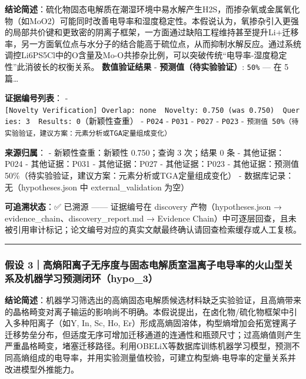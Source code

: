\documentclass[12pt,a4paper]{ctexart}
\begin{document}
\textbf{结论简述}：硫化物固态电解质在潮湿环境中易水解产生H2S，而掺杂氧或金属氧化物（如MoO2）可能同时改善电导率和湿度稳定性。本假说认为，氧掺杂引入更强的局部共价键和更致密的阴离子框架，一方面通过缺陷工程维持甚至提升Li+迁移率，另一方面氧位点与水分子的结合能高于硫位点，从而抑制水解反应。通过系统调控Li6PS5Cl中的O含量及Mo-O共掺杂比例，可以突破传统``电导率-湿度稳定性''此消彼长的权衡关系。 \textbf{数值验证结果} - \textbf{预测值（待实验验证）}: \texttt{50\%} --- 在 5 篇\ldots{}

\textbf{证据编号列表}： - \texttt{{[}Novelty\ Verification{]}\ Overlap:\ none\ \textbar{}\ Novelty:\ 0.750\ (was\ 0.750)\ \textbar{}\ Queries:\ 3\ \textbar{}\ Results:\ 0}（新颖性查重） - \texttt{P024} - \texttt{P031} - \texttt{P027} - \texttt{P023} - \texttt{预测值\ 50\%（待实验验证，建议方案：元素分析或TGA定量组成变化）}

\textbf{来源归属}： - 新颖性查重：新颖性 0.750；查询 3 次；结果 0 条 - 其他证据：P024 - 其他证据：P031 - 其他证据：P027 - 其他证据：P023 - 其他证据：预测值 50\%（待实验验证，建议方案：元素分析或TGA定量组成变化） - 数据库记录：无（hypotheses.json 中 external\_validation 为空）

\textbf{可追溯状态}：✅ 已溯源 ------ 证据编号在 discovery 产物（hypotheses.json → evidence\_chain、discovery\_report.md → Evidence Chain）中可逐层回查，且未被引用审计标记；论文编号对应的真实文献最终确认请回查检索缓存或人工复核。

\begin{center}\rule{0.5\linewidth}{0.5pt}\end{center}

\subsubsection{假设 3｜高熵阳离子无序度与固态电解质室温离子电导率的火山型关系及机器学习预测闭环（hypo\_3）}\label{ux5047ux8bbe-3ux9ad8ux71b5ux9633ux79bbux5b50ux65e0ux5e8fux5ea6ux4e0eux56faux6001ux7535ux89e3ux8d28ux5ba4ux6e29ux79bbux5b50ux7535ux5bfcux7387ux7684ux706bux5c71ux578bux5173ux7cfbux53caux673aux5668ux5b66ux4e60ux9884ux6d4bux95edux73afhypo_3}

\textbf{结论简述}：机器学习筛选出的高熵固态电解质候选材料缺乏实验验证，且高熵带来的晶格畸变对离子输运的影响尚不明确。本假说提出，在卤化物/硫化物框架中引入多种阳离子（如Y, In, Sc, Ho, Er）形成高熵固溶体，构型熵增加会拓宽锂离子迁移势垒分布，但适度无序可增加迁移通道的连通性和瓶颈尺寸；过高熵值则产生严重晶格畸变，堵塞迁移路径。利用OBELiX等数据库训练机器学习模型，预测不同高熵组成的电导率，并用实验测量值校验，可建立构型熵-电导率的定量关系并改进模型外推能力。
\end{document}
